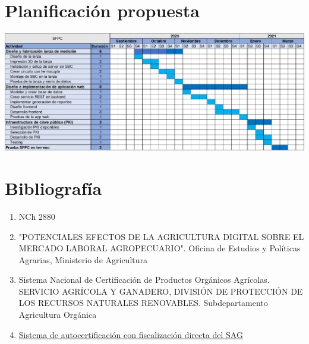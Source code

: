 \documentclass[12pt, letterpaper]{article}
\begin{document}
\section{Planificación propuesta }
\includegraphics[scale=0.45]{figures/gantt.png}


\section{Bibliografía}
\begin{enumerate}
	\item NCh 2880
	\item "POTENCIALES EFECTOS DE LA AGRICULTURA DIGITAL SOBRE EL MERCADO LABORAL AGROPECUARIO". Oficina de Estudios y Políticas Agrarias, Ministerio de Agricultura
	\item Sistema Nacional de Certificación de Productos Orgánicos Agrícolas. SERVICIO AGRÍCOLA Y GANADERO, DIVISIÓN DE PROTECCIÓN DE LOS RECURSOS NATURALES RENOVABLES. Subdepartamento Agricultura Orgánica
	\item \href{http://www.sag.cl/ambitos-de-accion/sistema-de-auto-certificacion-con-fiscalizacion-directa-del-sag}{Sistema de autocertificación con fiscalización directa del SAG}
\end{enumerate}
\end{document}
